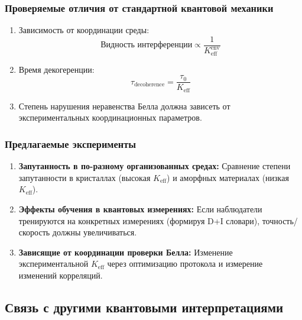 \documentclass[11pt,a4paper]{article}
\begin{document}
	\subsubsection{Проверяемые отличия от стандартной квантовой механики}
	\begin{enumerate}
		\item Зависимость от координации среды:
		\begin{equation}
			\text{Видность интерференции} \propto \frac{1}{K_{\mathrm{eff}}^{\text{env}}}
		\end{equation}
		
		\item Время декогеренции:
		\begin{equation}
			\tau_{\text{decoherence}} = \frac{\tau_0}{K_{\mathrm{eff}}}
		\end{equation}
		
		\item Степень нарушения неравенства Белла должна зависеть от экспериментальных координационных параметров.
	\end{enumerate}
	
	\subsubsection{Предлагаемые эксперименты}
	\begin{enumerate}
		\item \textbf{Запутанность в по-разному организованных средах:} Сравнение степени запутанности в кристаллах (высокая $K_{\mathrm{eff}}$) и аморфных материалах (низкая $K_{\mathrm{eff}}$).
		
		\item \textbf{Эффекты обучения в квантовых измерениях:} Если наблюдатели тренируются на конкретных измерениях (формируя D+I словари), точность/скорость должны увеличиваться.
		
		\item \textbf{Зависящие от координации проверки Белла:} Изменение экспериментальной $K_{\mathrm{eff}}$ через оптимизацию протокола и измерение изменений корреляций.
	\end{enumerate}
	
	\subsection{Связь с другими квантовыми интерпретациями}
	\label{subsec:interpretations}
	
\end{document}
